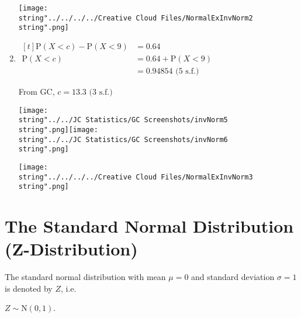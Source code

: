 \documentclass[11pt,a4paper]{book}
\begin{document}
\begin{example}
\begin{enumerate}[label=(\alph*)]
\begin{minipage}[t]{.6\textwidth}
\end{minipage}
\begin{minipage}[t]{.3\textwidth}
\begin{center}
\texttt{[image: \\string"../../../../Creative Cloud Files/NormalExInvNorm2\\string".png]}
\par\end{center}

\end{minipage}

\item
$
\begin{aligned}[t]
\text{P}\left(X<c\right)-\text{P}\left(X<9\right) & =0.64\\
\text{P}\left(X<c\right) & =0.64+\text{P}\left(X<9\right)\\
 & =0.94854\text{ (5 s.f.)}
\end{aligned}
$

\begin{minipage}[t]{.6\textwidth}

From GC, $c=13.3\text{ (3 s.f.)}$

\texttt{[image: \\string"../../JC Statistics/GC Screenshots/invNorm5\\string".png]}\hspace{1cm}\texttt{[image: \\string"../../JC Statistics/GC Screenshots/invNorm6\\string".png]}

\end{minipage}
\begin{minipage}[t]{.3\textwidth}
\begin{center}
\texttt{[image: \\string"../../../../Creative Cloud Files/NormalExInvNorm3\\string".png]}
\par\end{center}

\end{minipage}

\end{enumerate}

\end{example}

\section{The Standard Normal Distribution (Z-Distribution)}

The standard normal distribution with mean $\mu=0$ and standard deviation $\sigma=1$ is denoted by $Z$, i.e.

$Z\sim\text{N}\left(0,1\right)$.
\end{document}

